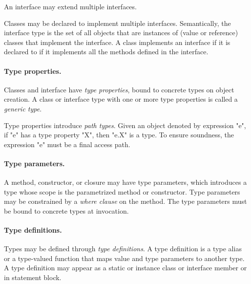         An interface may extend multiple interfaces.

Classes may be declared to implement 
multiple interfaces. 
Semantically, the interface type is the set of all objects that are
instances of (value or reference) classes that implement the
interface. A class implements an interface if it is declared to if
it implements all the methods defined in the interface.
        
\paragraph{Type properties.}


        Classes and interface have {\em type properties}, bound
        to concrete types on object creation.
        A class or interface type
        with one or more type properties is called a {\em
        generic type}.

        Type properties introduce {\em path types}.
        Given an object
        denoted by expression \xcd"e", if \xcd"e" has a 
        type property \xcd"X", then \xcd"e.X" is a type.
        To ensure soundness, the expression \xcd"e"
        must be a final access path.  

\paragraph{Type parameters.}


        A method, constructor, or closure may have type parameters, which
        introduces a type whose scope is the parametrized method or
        constructor. 
        Type parameters may be constrained by a {\em where
        clause} on the method.
        The type parameters must be bound to
        concrete types at invocation.

\paragraph{Type definitions.}

        Types may be defined through {\em type definitions}.
        A type definition is a type alias or a type-valued function
        that maps value and type parameters to another type.
        A type definition may appear as a static or instance
        class or interface
        member or in statement block.

